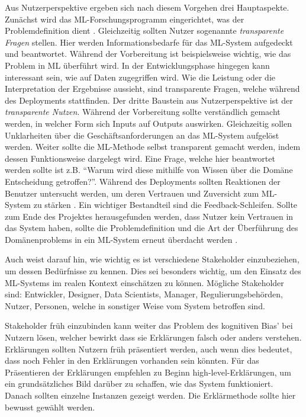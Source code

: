 Aus Nutzerperspektive ergeben sich nach diesem Vorgehen drei Hauptaspekte. Zunächst wird das ML-Forschungsprogramm eingerichtet, was der Problemdefinition dient \cite{zhou20182d}. Gleichzeitig sollten Nutzer sogenannte \emph{transparente Fragen} stellen. Hier werden Informationsbedarfe für das ML-System aufgedeckt und beantwortet. Während der Vorbereitung ist beispielsweise wichtig, wie das Problem in ML überführt wird. In der Entwicklungsphase hingegen kann interessant sein, wie auf Daten zugegriffen wird. Wie die Leistung oder die Interpretation der Ergebnisse aussieht, sind transparente Fragen, welche während des Deployments stattfinden. Der dritte Baustein aus Nutzerperspektive ist der \emph{transparente Nutzen}. Während der Vorbereitung sollte verständlich gemacht werden, in welcher Form sich Inputs auf Outputs auswirken. Gleichzeitig sollen Unklarheiten über die Geschäftsanforderungen an das ML-System aufgelöst werden. Weiter sollte die ML-Methode selbst transparent gemacht werden, indem dessen Funktionsweise dargelegt wird. Eine Frage, welche hier beantwortet werden sollte ist z.B. \enquote{Warum wird diese mithilfe von Wissen über die Domäne Entscheidung getroffen?}. Während des Deployments sollten Reaktionen der Benutzer untersucht werden, um deren Vertrauen und Zuversicht zum ML-System zu stärken \cite{zhou20182d}. Ein wichtiger Bestandteil sind die Feedback-Schleifen. Sollte zum Ende des Projektes herausgefunden werden, dass Nutzer kein Vertrauen in das System haben, sollte die Problemdefinition und die Art der Überführung des Domänenproblems in ein ML-System erneut überdacht werden \cite{zhou20182d}.

Auch \cite{vaughan2020human} weist darauf hin, wie wichtig es ist verschiedene Stakeholder einzubeziehen, um dessen Bedürfnisse zu kennen. Dies sei besonders wichtig, um den Einsatz des ML-Systems im realen Kontext einschätzen zu können. Mögliche Stakeholder sind: Entwickler, Designer, Data Scientists, Manager, Regulierungsbehörden, Nutzer, Personen, welche in sonstiger Weise vom System betroffen sind.

Stakeholder früh einzubinden kann weiter das Problem des kognitiven Bias' bei Nutzern lösen, welcher bewirkt dass sie Erklärungen falsch oder anders verstehen. Erklärungen sollten Nutzern früh präsentiert werden, auch wenn dies bedeutet, dass noch Fehler in den Erklärungen vorhanden sein könnten\cite{nourani2021anchoring}. Für das Präsentieren der Erklärungen empfehlen \cite{nourani2021anchoring} zu Beginn high-level-Erklärungen, um ein grundsätzliches Bild darüber zu schaffen, wie das System funktioniert. Danach sollten einzelne Instanzen gezeigt werden. Die Erklärmethode sollte hier bewusst gewählt werden.

